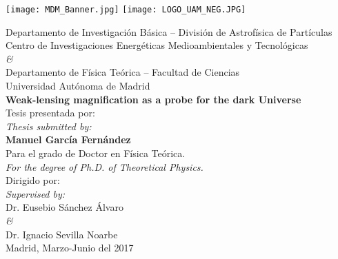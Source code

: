 \newpage
\thispagestyle{empty}
\begin{center}

\texttt{[image: MDM\_Banner.jpg]}
\texttt{[image: LOGO\_UAM\_NEG.JPG]}

\vspace{1cm}
Departamento de Investigaci\'on B\'asica -- Divisi\'on de Astrof\'isica de Part\'iculas\\
Centro de Investigaciones Energ\'eticas Medioambientales y Tecnol\'ogicas\\
\vspace{0.3cm}
{\it \&}\\
\vspace{0.3cm}
Departamento de F\'isica Te\'orica -- Facultad de Ciencias\\
Universidad Aut\'onoma de Madrid\\
\vspace{3cm}
{\bf \LARGE Weak-lensing magnification as a probe for the dark Universe}\\
\vspace{3cm}
Tesis presentada por:\\{\it Thesis submitted by:}\\
{\bf Manuel Garc\'ia Fern\'andez}\\
Para el grado de Doctor en F\'isica Te\'orica.\\{\it For the degree of Ph.D. of Theoretical Physics.}\\
\vspace{1cm}
Dirigido por:\\
{\it Supervised by:}\\
Dr. Eusebio S\'anchez \'Alvaro\\
{\it \&}\\
Dr. Ignacio Sevilla Noarbe\\
\vspace{1cm}
Madrid, Marzo-Junio del 2017

\end{center}
